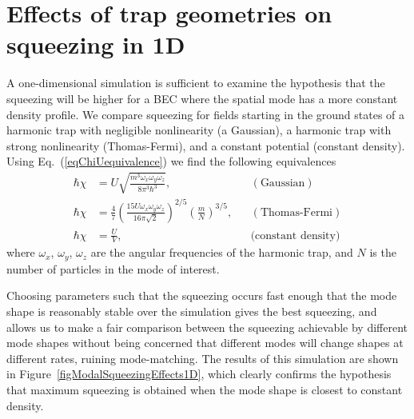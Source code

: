 \documentclass{iopart}
\begin{document}
\section{Effects of trap geometries on squeezing in 1D} \label{sec:1Dsim}

A one-dimensional simulation is sufficient to examine the hypothesis that the squeezing will be higher for a BEC where the spatial mode has a more constant density profile.  We compare squeezing for fields starting in the ground states of a harmonic trap with negligible nonlinearity (a Gaussian), a harmonic trap with strong nonlinearity (Thomas-Fermi), and a constant potential (constant density). Using Eq.~(\ref{eqChiUequivalence}) we find the following equivalences
\begin{align}
\hbar \chi &= U \sqrt{\frac{m^3 \omega_x \omega_y \omega_z}{8 \pi^3 \hbar^3}}, &&({\textrm{Gaussian}}) \\
%
\hbar \chi &= \frac{4}{7} \left( \frac{15 U \omega_x \omega_y \omega_z}{16 \pi \sqrt{2}} \right)^{2/5} \left( \frac{m}{N} \right)^{3/5}, &&({\textrm{Thomas-Fermi}}) \\
%
\hbar \chi &= \frac{U}{V}, &&{\textrm{(constant density)}}
\end{align}
%
where $\omega_x$, $\omega_y$, $\omega_z$ are the angular frequencies of the harmonic trap, and $N$ is the number of particles in the mode of interest.

Choosing parameters such that the squeezing occurs fast enough that the mode shape is reasonably stable over the simulation gives the best squeezing, and allows us to make a fair comparison between the squeezing achievable by different mode shapes without being concerned that different modes will change shapes at different rates, ruining mode-matching. The results of this simulation are shown in Figure~\ref{figModalSqueezingEffects1D}, which clearly confirms the hypothesis that maximum squeezing is obtained when the mode shape is closest to constant density.
\end{document}
